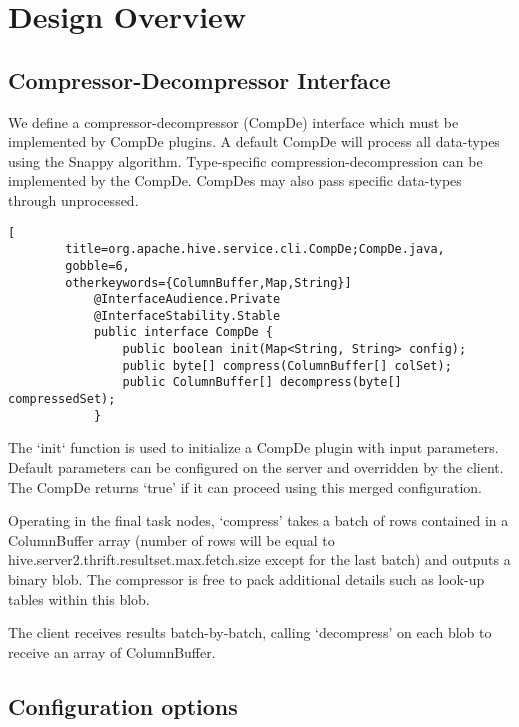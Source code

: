 \documentclass[11pt,a4paper]{article}
\begin{document}
\section{Design Overview}

	\subsection{Compressor-Decompressor Interface}
		
		We define a compressor-decompressor (CompDe) interface which must be implemented by CompDe plugins.
		A default CompDe will process all data-types using the Snappy algorithm.
		Type-specific compression-decompression can be implemented by the CompDe.
		CompDes may also pass specific data-types through unprocessed.
		
		\begin{lstlisting}[
		title=org.apache.hive.service.cli.CompDe;CompDe.java,
		gobble=6,
		otherkeywords={ColumnBuffer,Map,String}]
			@InterfaceAudience.Private
			@InterfaceStability.Stable
			public interface CompDe {
				public boolean init(Map<String, String> config);
				public byte[] compress(ColumnBuffer[] colSet);
				public ColumnBuffer[] decompress(byte[] compressedSet);
			}
		\end{lstlisting}
		
		The `init` function is used to initialize a CompDe plugin with input parameters.
		Default parameters can be configured on the server and overridden by the client.
		The CompDe returns `true' if it can proceed using this merged configuration.
		
		Operating in the final task nodes, `compress' takes a batch of rows contained in a ColumnBuffer array (number of rows will be equal to \linebreak hive.server2.thrift.resultset.max.fetch.size except for the last batch) and outputs a binary blob.
		The compressor is free to pack additional details such as look-up tables within this blob.
		
		The client receives results batch-by-batch, calling `decompress' on each blob to receive an array of ColumnBuffer.
		
	\subsection{Configuration options}
		
\end{document}
